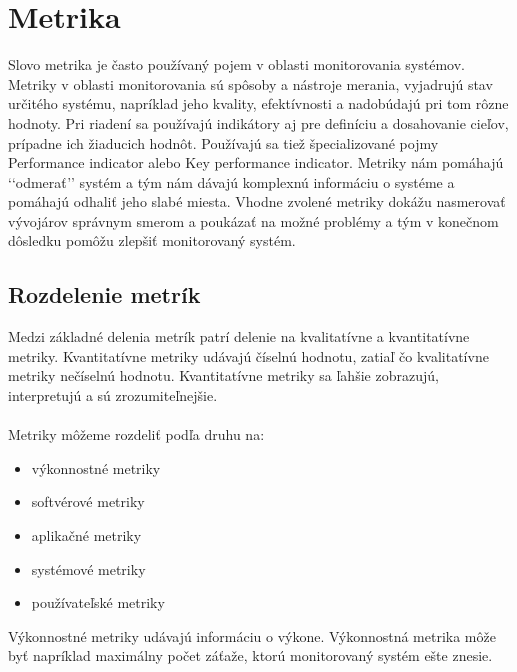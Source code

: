 \documentclass[a4paper, upjsfrontpage, disablespecwarning, thesismargins, thesislinespacing]{rnthesis}
\begin{document}
\section{Metrika}

Slovo metrika je často používaný pojem v oblasti monitorovania systémov.
Metri\-ky v oblasti monitorovania sú spôsoby a nástroje merania, vyjadrujú stav určitého systému, 
napríklad jeho kvality, efektívnosti a nadobúdajú pri tom rôzne hodnoty. 
Pri riadení sa používajú indikátory aj pre definíciu a dosahovanie cieľov, prípadne ich žiaducich hodnôt. 
Používajú sa tiež špecializované pojmy Performance indicator alebo Key performance indicator.
\cite{3}
Metriky nám pomáhajú ‘‘odmerať’’ systém a tým nám dávajú komplexnú informáciu o systéme a pomáhajú odhaliť jeho slabé miesta.
Vhodne zvolené metriky dokážu nasmerovať vývojárov správnym smerom a poukázať na možné problémy a tým v konečnom dôsledku pomôžu zlepšiť monitorovaný systém.

\subsection{Rozdelenie metrík}

Medzi základné delenia metrík patrí delenie na kvalitatívne a kvantitatívne metriky.
Kvantitatívne metriky udávajú číselnú hodnotu, zatiaľ čo kvalitatívne metriky nečíselnú hodnotu.  
Kvantitatívne metriky sa ľahšie zobrazujú, interpretujú a sú zrozumiteľnejšie.
~\\
~\\
Metriky môžeme rozdeliť podľa druhu na:

\begin{itemize}
	\item výkonnostné metriky
	\item softvérové metriky
	\item aplikačné metriky
	\item systémové metriky
	\item používateľské metriky
\end{itemize}

Výkonnostné metriky udávajú informáciu o výkone.
Výkonnostná metrika môže byť napríklad maximálny počet záťaže, ktorú monitorovaný systém ešte znesie.
\end{document}
